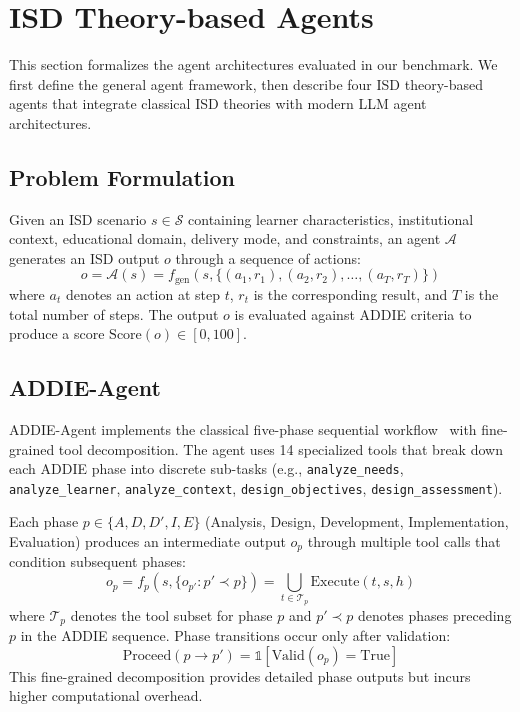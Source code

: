 \section{ISD Theory-based Agents}
\label{sec:agents}

This section formalizes the agent architectures evaluated in our benchmark. We first define the general agent framework, then describe four ISD theory-based agents that integrate classical ISD theories with modern LLM agent architectures.

\subsection{Problem Formulation}
\label{subsec:formulation}

Given an ISD scenario $s \in \mathcal{S}$ containing learner characteristics, institutional context, educational domain, delivery mode, and constraints, an agent $\mathcal{A}$ generates an ISD output $o$ through a sequence of actions:
\begin{equation}
o = \mathcal{A}(s) = f_{\text{gen}}(s, \{(a_1, r_1), (a_2, r_2), \ldots, (a_T, r_T)\})
\end{equation}
where $a_t$ denotes an action at step $t$, $r_t$ is the corresponding result, and $T$ is the total number of steps. The output $o$ is evaluated against ADDIE criteria to produce a score $\text{Score}(o) \in [0, 100]$.

\subsection{ADDIE-Agent}
\label{subsec:addie-agent}

ADDIE-Agent implements the classical five-phase sequential workflow~\cite{branson1975addie} with fine-grained tool decomposition. The agent uses 14 specialized tools that break down each ADDIE phase into discrete sub-tasks (e.g., \texttt{analyze\_needs}, \texttt{analyze\_learner}, \texttt{analyze\_context}, \texttt{design\_objectives}, \texttt{design\_assessment}).

Each phase $p \in \{A, D, D', I, E\}$ (Analysis, Design, Development, Implementation, Evaluation) produces an intermediate output $o_p$ through multiple tool calls that condition subsequent phases:
\begin{equation}
o_p = f_p(s, \{o_{p'} : p' \prec p\}) = \bigcup_{t \in \mathcal{T}_p} \text{Execute}(t, s, h)
\end{equation}
where $\mathcal{T}_p$ denotes the tool subset for phase $p$ and $p' \prec p$ denotes phases preceding $p$ in the ADDIE sequence. Phase transitions occur only after validation:
\begin{equation}
\text{Proceed}(p \to p') = \mathbb{1}[\text{Valid}(o_p) = \text{True}]
\end{equation}
This fine-grained decomposition provides detailed phase outputs but incurs higher computational overhead.

